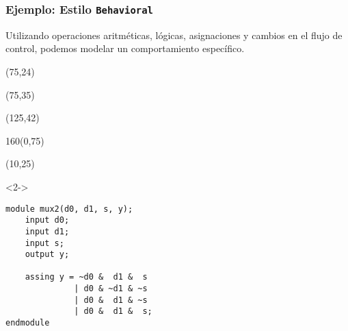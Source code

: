 \documentclass[aspectratio=169]{beamer}
\begin{document}
\begin{frame}[fragile,t]
    \frametitle{Ejemplo: Estilo \texttt{Behavioral}}
    Utilizando operaciones aritméticas, lógicas, asignaciones y cambios en el flujo de control, podemos modelar un comportamiento específico.
    \begin{textblock}{70}(75,24)
    \end{textblock}
    \begin{textblock}{65}(75,35)
    \end{textblock}
    \begin{textblock}{30}(125,42)
    \footnotesize
    \end{textblock}
    \begin{textblock}{160}(0,75)
    \begin{center}
    \end{center}
    \end{textblock}
    \begin{textblock}{58}(10,25)
    \begin{onlyenv}<2->
\begin{lstlisting}
module mux2(d0, d1, s, y);
    input d0;
    input d1;
    input s;
    output y;

    assing y = ~d0 &  d1 &  s 
              | d0 & ~d1 & ~s 
              | d0 &  d1 & ~s 
              | d0 &  d1 &  s;
endmodule
\end{lstlisting}
    \end{onlyenv}
    \end{textblock}
\end{frame}
\end{document}
